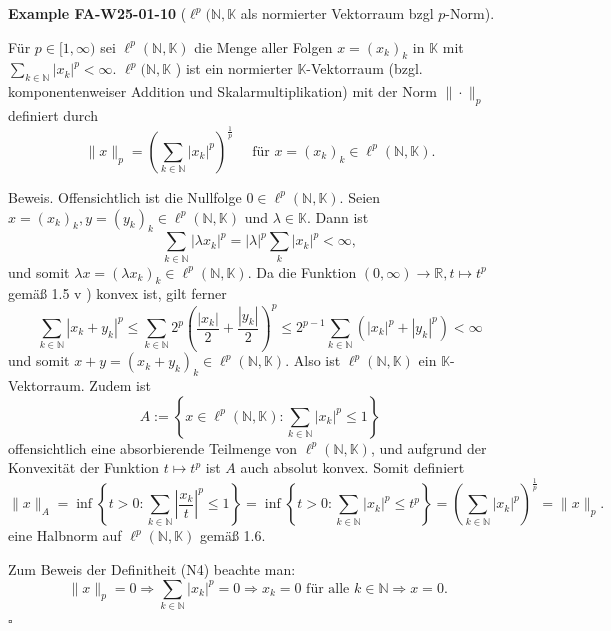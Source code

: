 \documentclass[10pt, letterpaper]{article}
\newcommand{\CustomHeading}[3]{%
  \par\medskip\noindent%
  \textbf{#1 #2} \textnormal{(#3)}.\enskip%
}
\newenvironment{EXA}[2]{\begin{unitbox}\CustomHeading{Example}{#1}{#2}}{\end{unitbox}}
\begin{document}
\begin{EXA}{FA-W25-01-10}{$\ell^{p}(\mathbb{N}, \mathbb{K}$ als normierter Vektorraum bzgl $p$-Norm}
Für $p \in[1, \infty)$ sei $\ell^{p}(\mathbb{N}, \mathbb{K})$ die Menge aller Folgen $x=\left(x_{k}\right)_{k}$ in $\mathbb{K}$ mit $\sum_{k \in \mathbb{N}}\left|x_{k}\right|^{p}<\infty$. $\ell^{p}(\mathbb{N}, \mathbb{K}$ ) ist ein normierter $\mathbb{K}$-Vektorraum (bzgl. komponentenweiser Addition und Skalarmultiplikation) mit der Norm $\|\cdot\|_{p}$ definiert durch
$$
\|x\|_{p}=\left(\sum_{k \in \mathbb{N}}\left|x_{k}\right|^{p}\right)^{\frac{1}{p}} \quad \text { für } x=\left(x_{k}\right)_{k} \in \ell^{p}(\mathbb{N}, \mathbb{K}) .
$$


Beweis. Offensichtlich ist die Nullfolge $0 \in \ell^{p}(\mathbb{N}, \mathbb{K})$. Seien $x=\left(x_{k}\right)_{k}, y=\left(y_{k}\right)_{k} \in \ell^{p}(\mathbb{N}, \mathbb{K})$ und $\lambda \in \mathbb{K}$. Dann ist
$$
\sum_{k \in \mathbb{N}}\left|\lambda x_{k}\right|^{p}=|\lambda|^{p} \sum_{k}\left|x_{k}\right|^{p}<\infty,
$$
und somit $\lambda x=\left(\lambda x_{k}\right)_{k} \in \ell^{p}(\mathbb{N}, \mathbb{K})$. Da die Funktion $(0, \infty) \rightarrow \mathbb{R}, t \mapsto t^{p}$ gemäß 1.5 v ) konvex ist, gilt ferner
$$
\sum_{k \in \mathbb{N}}\left|x_{k}+y_{k}\right|^{p} \leq \sum_{k \in \mathbb{N}} 2^{p}\left(\frac{\left|x_{k}\right|}{2}+\frac{\left|y_{k}\right|}{2}\right)^{p} \leq 2^{p-1} \sum_{k \in \mathbb{N}}\left(\left|x_{k}\right|^{p}+\left|y_{k}\right|^{p}\right)<\infty
$$
und somit $x+y=\left(x_{k}+y_{k}\right)_{k} \in \ell^{p}(\mathbb{N}, \mathbb{K})$. Also ist $\ell^{p}(\mathbb{N}, \mathbb{K})$ ein $\mathbb{K}$-Vektorraum. Zudem ist
$$
A:=\left\{x \in \ell^{p}(\mathbb{N}, \mathbb{K}): \sum_{k \in \mathbb{N}}\left|x_{k}\right|^{p} \leq 1\right\}
$$
offensichtlich eine absorbierende Teilmenge von $\ell^{p}(\mathbb{N}, \mathbb{K})$, und aufgrund der Konvexität der Funktion $t \mapsto t^{p}$ ist $A$ auch absolut konvex. Somit definiert
$$
\|x\|_{A}=\inf \left\{t>0: \sum_{k \in \mathbb{N}}\left|\frac{x_{k}}{t}\right|^{p} \leq 1\right\}=\inf \left\{t>0: \sum_{k \in \mathbb{N}}\left|x_{k}\right|^{p} \leq t^{p}\right\}=\left(\sum_{k \in \mathbb{N}}\left|x_{k}\right|^{p}\right)^{\frac{1}{p}}=\|x\|_{p} .
$$
eine Halbnorm auf $\ell^{p}(\mathbb{N}, \mathbb{K})$ gemäß 1.6.

Zum Beweis der Definitheit (N4) beachte man:
$$
\|x\|_{p}=0 \Longrightarrow \sum_{k \in \mathbb{N}}\left|x_{k}\right|^{p}=0 \Longrightarrow x_{k}=0 \text { für alle } k \in \mathbb{N} \Longrightarrow x=0 \text {. }
$$ \(\square\)
\end{EXA}
\end{document}
